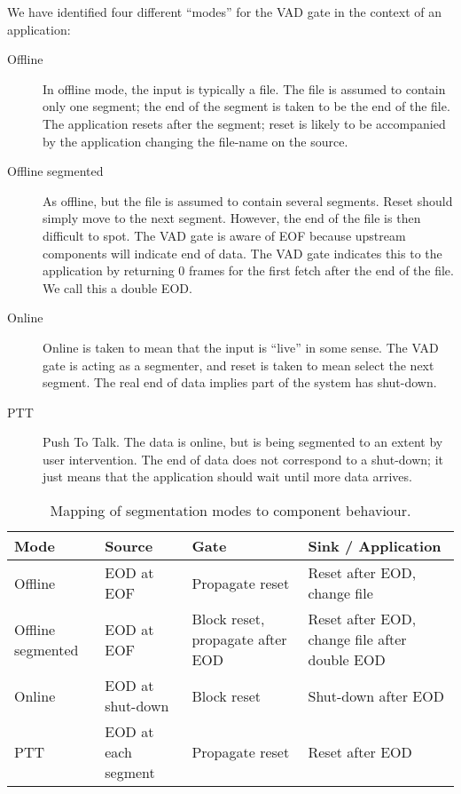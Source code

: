 We have identified four different ``modes'' for the VAD gate in the
context of an application:
\begin{description}
\item[Offline] In offline mode, the input is typically a file.  The
  file is assumed to contain only one segment; the end of the segment
  is taken to be the end of the file.  The application resets after
  the segment; reset is likely to be accompanied by the application
  changing the file-name on the source.
\item[Offline segmented] As offline, but the file is assumed to
  contain several segments.  Reset should simply move to the next
  segment.  However, the end of the file is then difficult to spot.
  The VAD gate is aware of EOF because upstream components will
  indicate end of data.  The VAD gate indicates this to the
  application by returning 0 frames for the first fetch after the end
  of the file.  We call this a double EOD.
\item[Online] Online is taken to mean that the input is ``live'' in
  some sense.  The VAD gate is acting as a segmenter, and reset is
  taken to mean select the next segment.  The real end of data implies
  part of the system has shut-down.
\item[PTT] Push To Talk.  The data is online, but is being segmented
  to an extent by user intervention.  The end of data does not
  correspond to a shut-down; it just means that the application should
  wait until more data arrives.
\end{description}

\begin{table}[htb]
  \centering
  \begin{tabular}{|m{2cm}|m{3cm}|m{3cm}|m{3cm}|}
    \hline
    {\bf Mode} & {\bf Source} & {\bf Gate} & {\bf Sink / Application} \\
    \hline\hline
    Offline
    & EOD at EOF
    & Propagate reset
    & Reset after EOD, change file \\
    \hline
    Offline segmented
    & EOD at EOF
    & Block reset, propagate after EOD
    & Reset after EOD, change file after double EOD \\
    \hline
    Online
    & EOD at shut-down
    & Block reset
    & Shut-down after EOD \\
    \hline
    PTT
    & EOD at each segment
    & Propagate reset
    & Reset after EOD \\
    \hline
  \end{tabular}
  \caption{Mapping of segmentation modes to component behaviour.}
  \label{tab:SegmentationMode}
\end{table}

